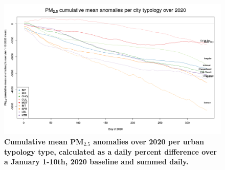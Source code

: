\documentclass[preprint,12pt]{elsarticle}
\begin{document}
\begin{figure}
\centering
\includegraphics[trim={0 19 22 43},clip,scale=0.45]{Images/pm25CulmReductionClusterMean_2020_filteredAnomalies.png}
\caption{\bf  Cumulative mean PM$_{2.5}$ anomalies over 2020 per urban typology type, calculated as a daily percent difference over a January 1-10th, 2020 baseline and summed daily.}
 \label{fig:pm25}
\end{figure}



%
%
%
%
\end{document}
